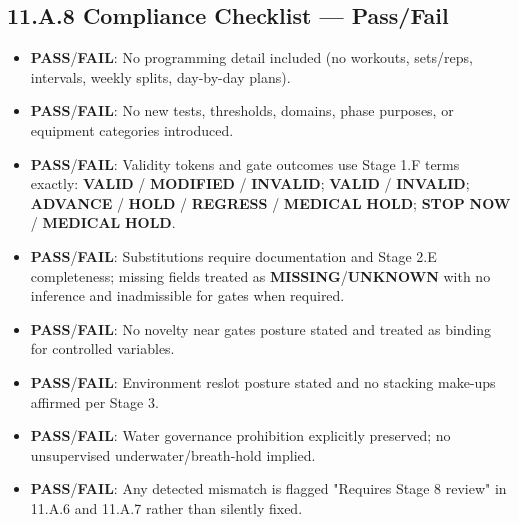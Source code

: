 \documentclass[10pt]{article}
\begin{document}
\newpage

\subsection*{11.A.8 Compliance Checklist — Pass/Fail}
{}

\begin{itemize}
\item \textbf{PASS}/\textbf{FAIL}: No programming detail included (no workouts, sets/reps, intervals, weekly splits, day-by-day plans).
\item \textbf{PASS}/\textbf{FAIL}: No new tests, thresholds, domains, phase purposes, or equipment categories introduced.
\item \textbf{PASS}/\textbf{FAIL}: Validity tokens and gate outcomes use Stage 1.F terms exactly: \textbf{VALID} / \textbf{MODIFIED} / \textbf{INVALID}; \textbf{VALID} / \textbf{INVALID}; \textbf{ADVANCE} / \textbf{HOLD} / \textbf{REGRESS} / \textbf{MEDICAL} \textbf{HOLD}; \textbf{STOP} \textbf{NOW} / \textbf{MEDICAL} \textbf{HOLD}.
\item \textbf{PASS}/\textbf{FAIL}: Substitutions require documentation and Stage 2.E completeness; missing fields treated as \textbf{MISSING}/\textbf{UNKNOWN} with no inference and inadmissible for gates when required.
\item \textbf{PASS}/\textbf{FAIL}: No novelty near gates posture stated and treated as binding for controlled variables.
\item \textbf{PASS}/\textbf{FAIL}: Environment reslot posture stated and no stacking make-ups affirmed per Stage 3.
\item \textbf{PASS}/\textbf{FAIL}: Water governance prohibition explicitly preserved; no unsupervised underwater/breath-hold implied.
\item \textbf{PASS}/\textbf{FAIL}: Any detected mismatch is flagged "Requires Stage 8 review" in 11.A.6 and 11.A.7 rather than silently fixed.
\end{itemize}
\end{document}

